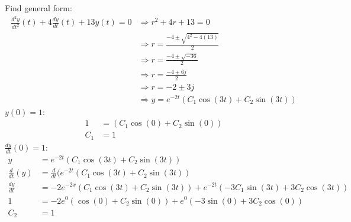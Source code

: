 \documentclass{article}
\begin{document}
\begin{enumerate}
Find general form:
\begin{align}
     \frac{d^2y}{dt^2}(t) + 4 \frac{dy}{dt}(t) + 13y(t) = 0 &\Rightarrow r^2 +4r +13 = 0\\
     &\Rightarrow r = \frac{-4 \pm \sqrt{4^2 -4(13)}}{2}\\
     &\Rightarrow r = \frac{-4 \pm \sqrt{-36}}{2}\\
     &\Rightarrow r = \frac{-4 \pm 6j}{2}\\
     &\Rightarrow r = -2 \pm 3j\\
     &\Rightarrow y = e^{-2t}\left(C_1\cos \left(3t\right)+C_2\sin \left(3t\right)\right)
\end{align}
$y(0) = 1$:    
\begin{align}
    1 &= \left(C_1\cos \left(0\right)+C_2\sin \left(0\right)\right)\\
    C_1 &= 1
\end{align}
$\frac{dy}{dt}(0) = 1$:    
\begin{align}
     y &= e^{-2t}(C_1\cos (3t)+C_2\sin(3t))\\
    \frac{d}{dt}(y) &= \frac{d}{dt}(e^{-2t}\left(C_1\cos \left(3t\right)+C_2\sin \left(3t\right)\right)\\
    \frac{dy}{dt} &= -2e^{-2x}\left(C_1\cos \left(3t\right)+C_2\sin \left(3t\right)\right)+e^{-2t}\left(-3C_1\sin \left(3t\right)+ 3C_2\cos \left(3t\right)\right)\\
    1 &= -2e^0(\cos(0)+C_2\sin(0))+e^0(-3\sin(0)+3C_2\cos(0))\\
    C_2 &= 1
\end{align}


\end{enumerate}
\end{document}
